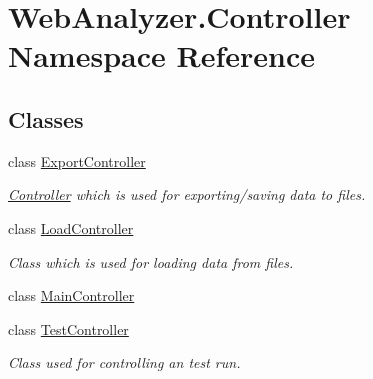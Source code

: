 \hypertarget{namespace_web_analyzer_1_1_controller}{}\section{Web\+Analyzer.\+Controller Namespace Reference}
\label{namespace_web_analyzer_1_1_controller}
\subsection*{Classes}
\begin{DoxyCompactItemize}
\item 
class \hyperlink{class_web_analyzer_1_1_controller_1_1_export_controller}{Export\+Controller}
\begin{DoxyCompactList}\small\item\em \hyperlink{namespace_web_analyzer_1_1_controller}{Controller} which is used for exporting/saving data to files. \end{DoxyCompactList}\item 
class \hyperlink{class_web_analyzer_1_1_controller_1_1_load_controller}{Load\+Controller}
\begin{DoxyCompactList}\small\item\em Class which is used for loading data from files. \end{DoxyCompactList}\item 
class \hyperlink{class_web_analyzer_1_1_controller_1_1_main_controller}{Main\+Controller}
\item 
class \hyperlink{class_web_analyzer_1_1_controller_1_1_test_controller}{Test\+Controller}
\begin{DoxyCompactList}\small\item\em Class used for controlling an test run. \end{DoxyCompactList}\end{DoxyCompactItemize}
